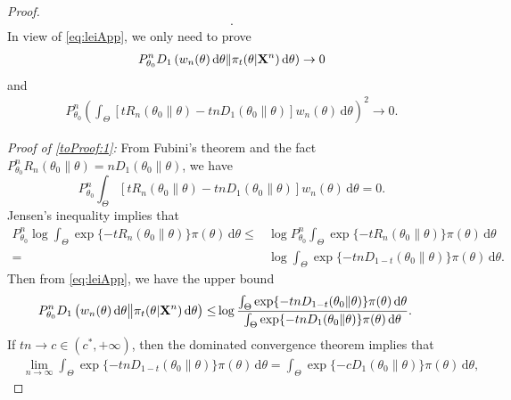 \documentclass[11pt]{article}
\theoremstyle{plain}
\theoremstyle{definition}
\theoremstyle{remark}
\begin{document}
\begin{appendices}
\begin{proof}
\begin{equation}
\begin{aligned}
    .
    \end{aligned}
\end{equation}
    In view of \eqref{eq:leiApp}, we only need to prove
\begin{align}
    P_{\theta_0}^n D_1 \left( w_n (\theta)\, \mathrm d \theta \| \pi_t (\theta| \mathbf{X}^n) \, \mathrm d \theta \right) \to 0
    \label{toProof:1}
\end{align}
and
\begin{align}
    P_{\theta_0}^n \left( 
    \int_{\Theta}
    \left[   t R_n(\theta_0\| \theta) - tn D_1 (\theta_0 \| \theta )  \right]
    w_n (\theta) \, \mathrm d \theta
    \right)^2
    \to 0
    .
    \label{toProof:2}
\end{align}

\noindent\emph{Proof of \eqref{toProof:1}:}
From Fubini's theorem and the fact $P_{\theta_0}^n R_n (\theta_0\| \theta) = n D_1 (\theta_0 \| \theta)$, we have
\begin{equation*}
P_{\theta_0}^n\int_{\Theta}
    \left[   t R_n(\theta_0\| \theta) - tn D_1 (\theta_0 \| \theta )  \right]
    w_n (\theta) \, \mathrm d \theta
    =0
    .
\end{equation*}
Jensen's inequality implies that
\begin{align*}
    P_{\theta_0}^n \log \int_{\Theta} \exp \{-t R_n (\theta_0\| \theta)\} \pi (\theta) \, \mathrm d \theta  
    \leq &
    \log 
    P_{\theta_0}^n
    \int_{\Theta} \exp \{-t R_n (\theta_0\| \theta)\} \pi (\theta) \, \mathrm d \theta  
    \\
    =&
    \log 
    \int_{\Theta} \exp \{-tn D_{1-t}(\theta_0 \| \theta)\} \pi (\theta) \, \mathrm d \theta.
\end{align*}
Then from \eqref{eq:leiApp}, we have the upper bound
\begin{align}
    P_{\theta_0}^n
     D_1\left( 
        w_n (\theta) \, \mathrm d \theta
        \big\|
        \pi_t (\theta | \mathbf{X}^{n}) \, \mathrm d \theta
    \right)
    \leq &
    \log \frac{
        \int_{\Theta} \exp \{-tn D_{1-t}(\theta_0 \| \theta)\} \pi (\theta) \, \mathrm d \theta
    }
    {
    \int_{\Theta} \exp \{-tn D_{1}(\theta_0 \| \theta)\} \pi (\theta) \, \mathrm d \theta
}.
\label{eq:KLBound}
\end{align}
If $tn\to c \in (c^*, +\infty)$, 
then the dominated convergence theorem implies that
\begin{align*}
    &
    \lim_{n\to \infty} \int_{\Theta} \exp \{-tn D_{1-t}(\theta_0 \| \theta)\} \pi (\theta) \, \mathrm d \theta
    =
    \int_{\Theta} \exp \{-c D_{1}(\theta_0 \| \theta)\} \pi (\theta) \, \mathrm d \theta,

\end{align*}
\end{proof}
\end{appendices}
\end{document}
